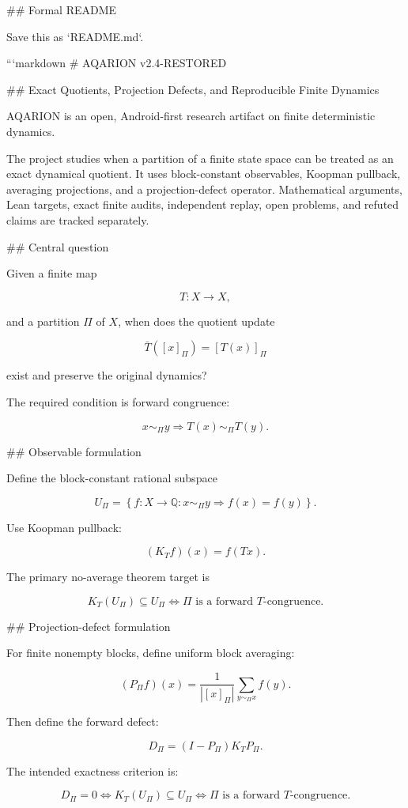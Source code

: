 ## Formal README

Save this as `README.md`.

```markdown
# AQARION v2.4-RESTORED

## Exact Quotients, Projection Defects, and Reproducible Finite Dynamics

AQARION is an open, Android-first research artifact on finite deterministic dynamics.

The project studies when a partition of a finite state space can be treated as an exact dynamical quotient. It uses block-constant observables, Koopman pullback, averaging projections, and a projection-defect operator. Mathematical arguments, Lean targets, exact finite audits, independent replay, open problems, and refuted claims are tracked separately.

## Central question

Given a finite map

\[
T:X\to X,
\]

and a partition \(\Pi\) of \(X\), when does the quotient update

\[
\bar T([x]_\Pi)=[T(x)]_\Pi
\]

exist and preserve the original dynamics?

The required condition is forward congruence:

\[
x\sim_\Pi y
\Longrightarrow
T(x)\sim_\Pi T(y).
\]

## Observable formulation

Define the block-constant rational subspace

\[
U_\Pi=
\left\{
f:X\to\mathbb Q:
x\sim_\Pi y\Rightarrow f(x)=f(y)
\right\}.
\]

Use Koopman pullback:

\[
(K_Tf)(x)=f(Tx).
\]

The primary no-average theorem target is

\[
K_T(U_\Pi)\subseteq U_\Pi
\Longleftrightarrow
\Pi\text{ is a forward }T\text{-congruence}.
\]

## Projection-defect formulation

For finite nonempty blocks, define uniform block averaging:

\[
(P_\Pi f)(x)
=
\frac{1}{|[x]_\Pi|}
\sum_{y\sim_\Pi x}f(y).
\]

Then define the forward defect:

\[
D_\Pi=(I-P_\Pi)K_TP_\Pi.
\]

The intended exactness criterion is:

\[
\boxed{
D_\Pi=0
\Longleftrightarrow
K_T(U_\Pi)\subseteq U_\Pi
\Longleftrightarrow
\Pi\text{ is a forward }T\text{-congruence}.
}
\]

